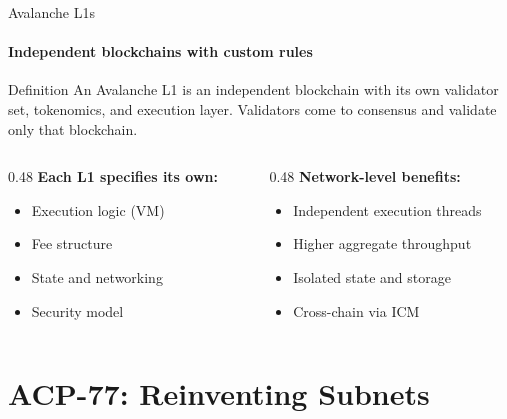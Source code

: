 \documentclass[aspectratio=169]{beamer}
\begin{document}
\begin{frame}{Avalanche L1s}
	\framesubtitle{Independent blockchains with custom rules}

	\begin{block}{Definition}
		An Avalanche L1 is an independent blockchain with its own validator set,
		tokenomics, and execution layer. Validators come to consensus and validate
		only that blockchain.
	\end{block}

	\vspace{0.5em}
	\begin{columns}[t]
		\begin{column}{0.48\textwidth}
			\textbf{Each L1 specifies its own:}
			\begin{itemize}
				\item Execution logic (VM)
				\item Fee structure
				\item State and networking
				\item Security model
			\end{itemize}
		\end{column}
		\begin{column}{0.48\textwidth}
			\textbf{Network-level benefits:}
			\begin{itemize}
				\item Independent execution threads
				\item Higher aggregate throughput
				\item Isolated state and storage
				\item Cross-chain via ICM
			\end{itemize}
		\end{column}
	\end{columns}
\end{frame}

\section{ACP-77: Reinventing Subnets}
\end{document}
